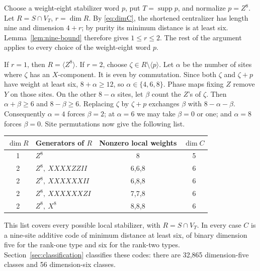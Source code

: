 Choose a weight-eight stabilizer word \(p\), put \(T=\operatorname{supp}p\),
and normalize \(p=Z^8\). Let \(R=S\cap V_T\), \(r=\dim R\).
By \eqref{eq:dimC}, the shortened centralizer has length nine and
dimension \(4+r\); by purity its minimum distance is at least six.
Lemma~\ref{lem:nine-bound} therefore gives \(1\leq r\leq2\).
The rest of the argument applies to every choice of the weight-eight
word \(p\).

If \(r=1\), then \(R=\langle Z^8\rangle\).
If \(r=2\), choose \(\zeta\in R\setminus\langle p\rangle\).
Let \(\alpha\) be the number of sites where \(\zeta\) has an \(X\)-component.
It is even by commutation. Since both \(\zeta\) and \(\zeta+p\) have weight
at least six, \(8+\alpha\geq12\), so \(\alpha\in\{4,6,8\}\).
Phase maps fixing \(Z\) remove \(Y\) on those sites. On the other
\(8-\alpha\) sites, let \(\beta\) count the \(Z\)'s of \(\zeta\).
Then \(\alpha+\beta\geq6\) and \(8-\beta\geq6\).
Replacing \(\zeta\) by \(\zeta+p\) exchanges \(\beta\) with \(8-\alpha-\beta\).
Consequently \(\alpha=4\) forces \(\beta=2\); at \(\alpha=6\) we may take
\(\beta=0\) or one; and \(\alpha=8\) forces \(\beta=0\).
Site permutations now give the following list.

\begin{center}
\begin{tabular}{@{}clcc@{}}\toprule
\(\dim R\)&Generators of \(R\)&Nonzero local weights&\(\dim C\)\\\midrule
1&\(Z^8\)&8&5\\
2&\(Z^8,\ XXXXZZII\)&6,6,8&6\\
2&\(Z^8,\ XXXXXXII\)&6,8,8&6\\
2&\(Z^8,\ XXXXXXZI\)&7,7,8&6\\
2&\(Z^8,\ X^8\)&8,8,8&6\\\bottomrule
\end{tabular}
\end{center}

This list covers every possible local stabilizer, with \(R=S\cap V_T\).
In every case \(C\) is a nine-site additive code of minimum distance at
least six, of binary dimension five for the rank-one type and six for
the rank-two types. Section~\ref{sec:classification} classifies these
codes: there are 32,865 dimension-five classes and 56 dimension-six
classes.
